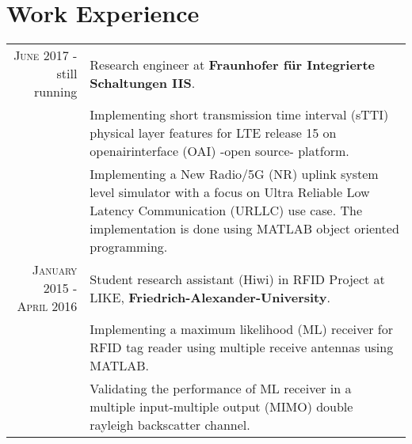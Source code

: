 \documentclass[a4paper,10pt]{article}
\begin{document}
\section{Work Experience}
\begin{tabular}{r|p{9cm}}
	\textsc{June} 2017 - still running & Research engineer at {\bf Fraunhofer für Integrierte Schaltungen IIS}.\\
	& Implementing short transmission time interval (sTTI) physical layer features for LTE release 15 on openairinterface (OAI) -open source- platform. \\
	& Implementing a New Radio/5G (NR) uplink system level simulator with a focus on Ultra Reliable Low Latency Communication (URLLC) use case. The implementation is done using MATLAB object oriented programming.\\	
	\textsc{January} 2015 - \textsc{April} 2016 & Student research assistant (Hiwi) in RFID Project at LIKE, {\bf Friedrich-Alexander-University}.\\
	& Implementing a maximum likelihood (ML) receiver for RFID tag reader using multiple receive antennas using MATLAB. \\
	& Validating the performance of ML receiver in a multiple input-multiple output (MIMO) double rayleigh backscatter channel. \\ 
\end{tabular}
\end{document}
